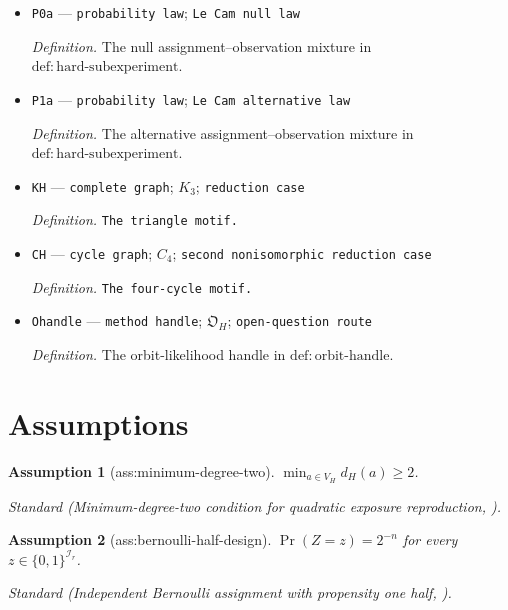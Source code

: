 \documentclass{article}
\newtheorem{assumption}{Assumption}
\begin{document}
\begin{itemize}
  \par\smallskip\noindent\emph{Definition.} \texttt{Independent Rademacher spillover signs under the alternative proof prior.}
  \item \texttt{P0a} --- \texttt{probability law}; \texttt{Le Cam null law}
  \par\smallskip\noindent\emph{Definition.} The null assignment--observation mixture in \(\mathrm{def:hard\text{-}subexperiment}\).
  \item \texttt{P1a} --- \texttt{probability law}; \texttt{Le Cam alternative law}
  \par\smallskip\noindent\emph{Definition.} The alternative assignment--observation mixture in \(\mathrm{def:hard\text{-}subexperiment}\).
  \item \texttt{KH} --- \texttt{complete graph}; \(K_3\); \texttt{reduction case}
  \par\smallskip\noindent\emph{Definition.} \texttt{The triangle motif.}
  \item \texttt{CH} --- \texttt{cycle graph}; \(C_4\); \texttt{second nonisomorphic reduction case}
  \par\smallskip\noindent\emph{Definition.} \texttt{The four-\allowbreak{}cycle motif.}
  \item \texttt{Ohandle} --- \texttt{method handle}; \(\mathfrak O_H\); \texttt{open-\allowbreak{}question route}
  \par\smallskip\noindent\emph{Definition.} The orbit-likelihood handle in \(\mathrm{def:orbit\text{-}handle}\).
\end{itemize}

\section{Assumptions}

\begin{assumption}[ass:minimum-degree-two]\label{ass:minimum-degree-two}
\(\min_{a\in V_H}d_H(a)\ge2\).
\par\smallskip\noindent\emph{Standard} (Minimum-degree-two condition for quadratic exposure reproduction, \cite{GaoHarshawSavjeWang2026}).
\end{assumption}

\begin{assumption}[ass:bernoulli-half-design]\label{ass:bernoulli-half-design}
\(\Pr(Z=z)=2^{-n}\) for every \(z\in\{0,1\}^{\mathcal I_r}\).
\par\smallskip\noindent\emph{Standard} (Independent Bernoulli assignment with propensity one half, \cite{GaoHarshawSavjeWang2026}).
\end{assumption}
\end{document}
